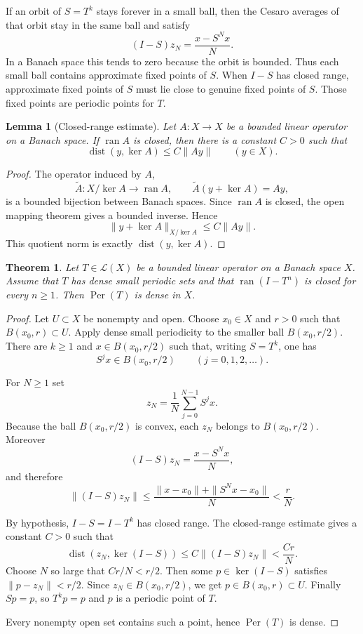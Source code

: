 \documentclass[11pt]{article}
\newtheorem{theorem}{Theorem}
\newtheorem{lemma}{Lemma}
\newcommand{\Per}{\operatorname{Per}}
\newcommand{\ran}{\operatorname{ran}}
\newcommand{\dist}{\operatorname{dist}}
\begin{document}
If an orbit of $S=T^k$ stays forever in a small ball, then the Cesaro averages
of that orbit stay in the same ball and satisfy
\[
  (I-S)z_N = \frac{x-S^N x}{N}.
\]
In a Banach space this tends to zero because the orbit is bounded. Thus each
small ball contains approximate fixed points of $S$. When $I-S$ has closed
range, approximate fixed points of $S$ must lie close to genuine fixed points
of $S$. Those fixed points are periodic points for $T$.

\begin{lemma}[Closed-range estimate]
Let $A:X\to X$ be a bounded linear operator on a Banach space. If $\ran A$ is
closed, then there is a constant $C>0$ such that
\[
  \dist(y,\ker A)\leq C\|Ay\| \qquad (y\in X).
\]
\end{lemma}

\begin{proof}
The operator induced by $A$,
\[
  \widetilde A:X/\ker A\longrightarrow \ran A,\qquad
  \widetilde A(y+\ker A)=Ay,
\]
is a bounded bijection between Banach spaces. Since $\ran A$ is closed, the
open mapping theorem gives a bounded inverse. Hence
\[
  \|y+\ker A\|_{X/\ker A}\leq C\|Ay\|.
\]
This quotient norm is exactly $\dist(y,\ker A)$.
\end{proof}

\begin{theorem}
Let $T\in\mathcal L(X)$ be a bounded linear operator on a Banach space $X$.
Assume that $T$ has dense small periodic sets and that $\ran(I-T^n)$ is closed
for every $n\geq 1$. Then $\Per(T)$ is dense in $X$.
\end{theorem}

\begin{proof}
Let $U\subset X$ be nonempty and open. Choose $x_0\in X$ and $r>0$ such that
$B(x_0,r)\subset U$. Apply dense small periodicity to the smaller ball
$B(x_0,r/2)$. There are $k\geq 1$ and $x\in B(x_0,r/2)$ such that, writing
$S=T^k$, one has
\[
  S^j x\in B(x_0,r/2)\qquad (j=0,1,2,\ldots).
\]

For $N\geq 1$ set
\[
  z_N=\frac1N\sum_{j=0}^{N-1}S^j x .
\]
Because the ball $B(x_0,r/2)$ is convex, each $z_N$ belongs to
$B(x_0,r/2)$. Moreover
\[
  (I-S)z_N=\frac{x-S^N x}{N},
\]
and therefore
\[
  \|(I-S)z_N\|
  \leq \frac{\|x-x_0\|+\|S^N x-x_0\|}{N}
  <\frac{r}{N}.
\]

By hypothesis, $I-S=I-T^k$ has closed range. The closed-range estimate gives
a constant $C>0$ such that
\[
  \dist(z_N,\ker(I-S))\leq C\|(I-S)z_N\|<\frac{Cr}{N}.
\]
Choose $N$ so large that $Cr/N<r/2$. Then some $p\in\ker(I-S)$ satisfies
$\|p-z_N\|<r/2$. Since $z_N\in B(x_0,r/2)$, we get $p\in B(x_0,r)\subset U$.
Finally $S p=p$, so $T^k p=p$ and $p$ is a periodic point of $T$.

Every nonempty open set contains such a point, hence $\Per(T)$ is dense.
\end{proof}
\end{document}
